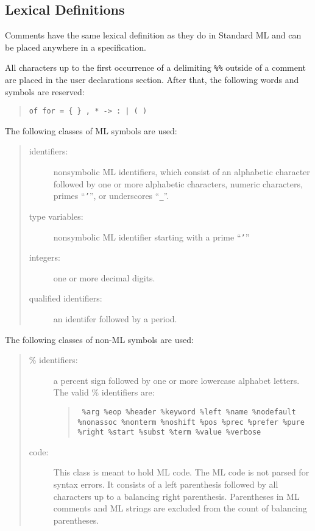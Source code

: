 \subsection{Lexical Definitions}

Comments have the same lexical definition as they do in Standard
ML and can be placed anywhere in a specification.

All characters up to the first occurrence of a delimiting
{\tt  \%\%} outside of
a comment are placed in the user declarations section.  After that, the
following words and symbols are reserved:
\begin{quote}

\verb'of for = { } , * -> : | ( )'

\end{quote}
        
The following classes of ML symbols are used:
\begin{quote}
\begin{description}
\item[identifiers:]
                nonsymbolic ML identifiers, which consist
                of an alphabetic character followed by one or
                more alphabetic characters, numeric characters,
                primes ``{\tt '}'', or underscores ``{\tt \_}''.
\item[type variables:]
                nonsymbolic ML identifier starting with a prime ``{\tt '}''
\item[integers:] one or more decimal digits.
\item[qualified identifiers:] an identifer followed by a period.

\end{description}
\end{quote}
The following classes of non-ML symbols are used:
\begin{quote}
\begin{description}
\item[\% identifiers:]
                a percent sign followed by one or more lowercase
                alphabet letters.  The valid \% identifiers
                are:
\begin{quote}
\raggedright
\tt
                \%arg \%eop \%header \%keyword \%left \%name \%nodefault
                \%nonassoc \%nonterm \%noshift \%pos \%prec \%prefer
                \%pure \%right \%start \%subst \%term \%value \%verbose
\end{quote}
\item[code:]
                This class is meant to hold ML code.  The ML code is not
                parsed for syntax errors.  It consists of a left parenthesis
                followed by all characters up to a balancing right
                parenthesis.  Parentheses in ML comments and ML strings
                are excluded from the count of balancing parentheses.

\end{description}
\end{quote}


